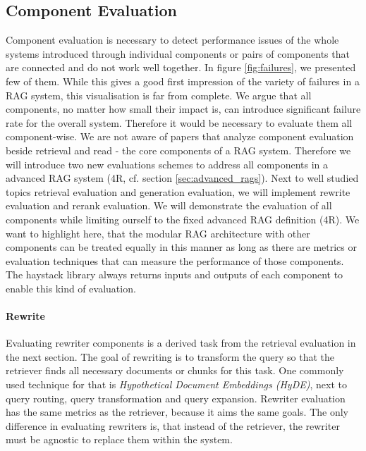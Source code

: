 \subsection{Component Evaluation}

Component evaluation is necessary to detect performance issues of the whole systems introduced through individual components or pairs of components that are connected and do not work well together. In figure \ref{fig:failures}, we presented few of them. While this gives a good first impression of the variety of failures in a RAG system, this visualisation is far from complete. We argue that all components, no matter how small their impact is, can introduce significant failure rate for the overall system. Therefore it would be necessary to evaluate them all component-wise. We are not aware of papers that analyze component evaluation beside retrieval and read - the core components of a RAG system. Therefore we will introduce two new evaluations schemes to address all components in a advanced RAG system (4R, cf. section \ref{sec:advanced_rags}). Next to well studied topics retrieval evaluation and generation evaluation, we will implement rewrite evaluation and rerank evaluation. We will demonstrate the evaluation of all components while limiting ourself to the fixed advanced RAG definition (4R). We want to highlight here, that the modular RAG architecture with other components can be treated equally in this manner as long as there are metrics or evaluation techniques that can measure the performance of those components. The haystack library always returns inputs and outputs of each component to enable this kind of evaluation.

\paragraph{Rewrite}

Evaluating rewriter components is a derived task from the retrieval evaluation in the next section. The goal of rewriting is to transform the query so that the retriever finds all necessary documents or chunks for this task. One commonly used technique for that is \textit{Hypothetical Document Embeddings (HyDE)}\cite{Gao.2023}, next to query routing, query transformation and query expansion. Rewriter evaluation has the same metrics as the retriever, because it aims the same goals. The only difference in evaluating rewriters is, that instead of the retriever, the rewriter must be agnostic to replace them within the system. 

